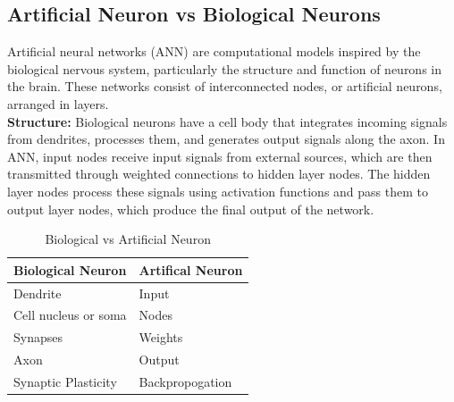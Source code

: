 \subsection{Artificial Neuron vs Biological Neurons}
Artificial neural networks (ANN) are computational models inspired by the biological nervous system, particularly the structure and function of neurons in the brain. These networks consist of interconnected nodes, or artificial neurons, arranged in layers.
\\
\textbf{Structure:} Biological neurons have a cell body that integrates incoming signals from dendrites, processes them, and generates output signals along the axon. In ANN, input nodes receive input signals from external sources, which are then transmitted through weighted connections to hidden layer nodes. The hidden layer nodes process these signals using activation functions and pass them to output layer nodes, which produce the final output of the network.
\begin{table}[htbp]
   \centering
\caption{Biological vs Artificial Neuron}
\scriptsize
 \begin{tabular}{|p{3cm}|p{2cm}|}
 \hline
   \textbf{Biological Neuron} & \textbf{Artifical Neuron} \\
\hline
Dendrite & Input \\
\hline
Cell nucleus or soma & Nodes  \\
\hline
Synapses & Weights \\
\hline
Axon & Output  \\
\hline
Synaptic Plasticity & Backpropogation \\
\hline
    \end{tabular}
  \end{table}


